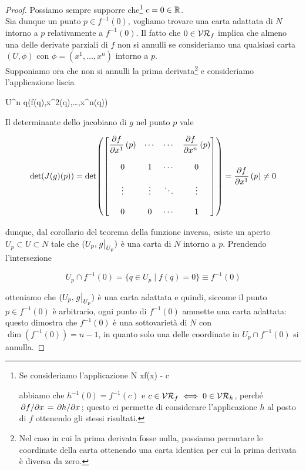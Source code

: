 \begin{proof}
	Possiamo sempre supporre che\footnote{%
		Se consideriamo l'applicazione
			{N}{\R}
			{x}{f(x) - c}
		
		abbiamo che $ h^{-1}(0) = f^{-1}(c) $ e $ c \in \mathcal{VR}_{f} \iff 0 \in \mathcal{VR}_{h} $, perché $ \pdv*{f}{x} = \pdv*{h}{x} $; questo ci permette di considerare l'applicazione $ h $ al posto di $ f $ ottenendo gli stessi risultati.%
	} $ c = 0 \in \mathbb{R} $.\\
	Sia dunque un punto $ p \in f^{-1}(0) $, vogliamo trovare una carta adattata di $ N $ intorno a $ p $ relativamente a $ f^{-1}(0) $. Il fatto che $ 0 \in \mathcal{VR}_{f} $ implica che almeno una delle derivate parziali di $ f $ non si annulli se consideriamo una qualsiasi carta $ (U,\phi) $ con $ \phi = (x^{1},\dots,x^{n}) $ intorno a $ p $.\\
	Supponiamo ora che non si annulli la prima derivata\footnote{%
		Nel caso in cui la prima derivata fosse nulla, possiamo permutare le coordinate della carta ottenendo una carta identica per cui la prima derivata è diversa da zero.%
	} e consideriamo l'applicazione liscia

		{U}{\R^{n}}
		{q}{(f(q),x^{2}(q),\dots,x^{n}(q))}

	Il determinante dello jacobiano di $ g $ nel punto $ p $ vale

	\begin{equation}
		\det(J(g)(p)) = \det( \bmqty{ %
			\dpdv{f}{x^{1}} \, (p) & \cdots & \cdots & \dpdv{f}{x^{n}} \, (p) \\\\ %
			0 & 1 & \cdots & 0 \\\\ %
			\vdots & \vdots & \ddots & \vdots \\\\ %
			0 & 0 & \cdots & 1
			} ) %
		= \dpdv{f}{x^{1}} \, (p) \neq 0
	\end{equation}

	dunque, dal corollario del teorema della funzione inversa, esiste un aperto $ U_{p} \subset U \subset N $ tale che $ (U_{p},\eval{g}_{U_{p}}) $ è una carta di $ N $ intorno a $ p $. Prendendo l'intersezione
	
	\begin{equation}
		U_{p} \cap f^{-1}(0) = \{ q \in U_{p} \mid f(q)=0 \} \equiv f^{-1}(0)
	\end{equation}

	otteniamo che $ (U_{p},\eval{g}_{U_{p}}) $ è una carta adattata e quindi, siccome il punto $ p \in f^{-1}(0) $ è arbitrario, ogni punto di $ f^{-1}(0) $ ammette una carta adattata: questo dimostra che $ f^{-1}(0) $ è una sottovarietà di $ N $ con $ \dim(f^{-1}(0)) = n-1 $, in quanto solo una delle coordinate in $ U_{p} \cap f^{-1}(0) $ si annulla.
\end{proof}

